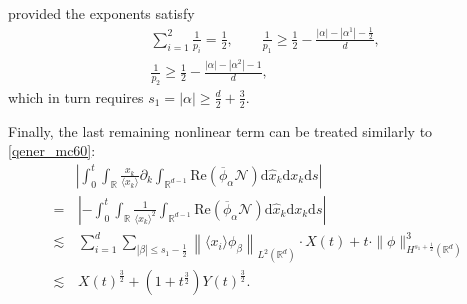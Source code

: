 \documentclass[10pt,twoside,a4paper]{article}
\numberwithin{equation}{section}\allowdisplaybreaks
\def\leq{\leqslant}
\def\geq{\geqslant}
\begin{document}
provided the exponents satisfy
\begin{align}   
	&	\sum_{i=1}^2 \frac{1}{p_i}=\frac 12, \qquad
	\frac{1}{p_1}\geq \frac 12-\frac{|\alpha|-|\alpha^1|-\frac12}{d}, \nonumber\\
	&\frac{1}{p_2}\geq \frac 12-\frac{|\alpha|-|\alpha^2|-1}{d},\nonumber
\end{align}
which in turn requires $ s_1=|\alpha|\geq \frac{d}{2}+\frac32. $

Finally, the last remaining nonlinear term can be treated similarly to  \eqref{qener_mc60}:
\begin{align*}
	&\left|\int_0^t	\int_{\mathbb{R}}\frac{x_k}{\langle x_k\rangle}   \partial_k\int_{\mathbb{R}^{d-1}}   \mathrm{Re}\left( \overline{\phi }_{\alpha } \mathcal{N}\right) \mathrm{d} \hat{x}_k  \mathrm{d} x_k \mathrm{d} s\right|\\
	=&\,\left| -\int_0^t	\int_{\mathbb{R}}\frac{1}{\langle x_k\rangle^2}    \int_{\mathbb{R}^{d-1}}   \mathrm{Re}\left( \overline{\phi }_{\alpha } \mathcal{N}\right) \mathrm{d} \hat{x}_k  \mathrm{d} x_k \mathrm{d} s\right|\nonumber\\
	\lesssim &\,\sum_{i=1}^d\sum_{|\beta| \leq s_1-\frac12}\left\| \langle x_i\rangle \phi_{\beta}\right\|_{L^2(\mathbb{R}^d)} \cdot X(t)+ t\cdot\|\phi\|^3_{H^{s_1+\frac 12}(\mathbb{R}^{d})}\nonumber\\
	\lesssim & \, X(t)^{\frac 32}+ (1+t^{\frac32}) Y(t)^{\frac 32}.
\end{align*}
\end{document}
